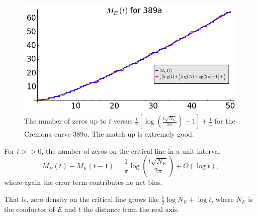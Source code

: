 \begin{figure}[!h]
    \centering
    \includegraphics[width=1.0\textwidth]{graphics/M_E_389.png}
    \caption{The number of zeros up to $t$ versus $\frac{t}{\pi}\left[\log\left(\frac{t\sqrt{N_E}}{2\pi}\right) -1 \right] + \frac{1}{4}$ for the Cremona curve $389a$. The match up is extremely good.}
    \label{fig:M_E_389}
\end{figure}

\begin{corollary}[GRH]
For $t>>0$, the number of zeros on the critical line in a unit interval
\begin{equation}
M_E(t)-M_E(t-1) = \frac{1}{\pi}\log\left(\frac{t\sqrt{N_E}}{2\pi}\right) + O(\log t),
\end{equation}
where again the error term contributes no net bias.
\end{corollary}

That is, zero density on the critical line grows like $\frac{1}{2}\log N_E + \log t$, where $N_E$ is the conductor of $E$ and $t$ the distance from the real axis. \\

